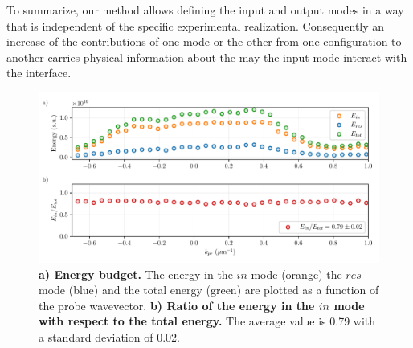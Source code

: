 To summarize, our method allows defining the input and output modes in a way that is independent of the specific experimental realization. Consequently an increase of the contributions
of one mode or the other from one configuration to another carries physical information about the may the input mode interact with the interface.  
 \begin{figure}
    \centering
    \includegraphics[width=1\textwidth]{chap_stimulated_hawking/fig/energy_budget.pdf}
    \caption{\textbf{a) Energy budget.} The energy in the $in$ mode (orange) the $res$ mode (blue) and the total energy (green) are plotted as a function of the probe wavevector. 
    \textbf{b) Ratio of the energy in the $in$ mode with respect to the total energy.} The average value is 0.79 with a standard deviation of 0.02.}
    \label{fig:energy_budget}
 \end{figure}

